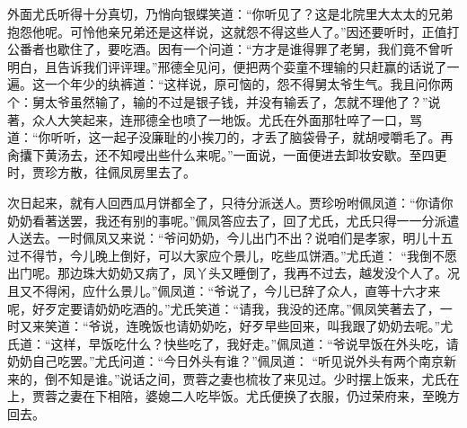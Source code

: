 \begin{parag}
    外面尤氏听得十分真切，乃悄向银蝶笑道：“你听见了？这是北院里大太太的兄弟抱怨他呢。可怜他亲兄弟还是这样说，这就怨不得这些人了。”因还要听时，正值打公番者也歇住了，要吃酒。因有一个问道：“方才是谁得罪了老舅，我们竟不曾听明白，且告诉我们评评理。”邢德全见问，便把两个娈童不理输的只赶赢的话说了一遍。这一个年少的纨裤道：“这样说，原可恼的，怨不得舅太爷生气。我且问你两个：舅太爷虽然输了，输的不过是银子钱，并没有输丢了，怎就不理他了？”说著，众人大笑起来，连邢德全也喷了一地饭。尤氏在外面那牡啐了一口，骂道：“你听听，这一起子没廉耻的小挨刀的，才丢了脑袋骨子，就胡唚嚼毛了。再肏攮下黄汤去，还不知唚出些什么来呢。”一面说，一面便进去卸妆安歇。至四更时，贾珍方散，往佩凤房里去了。
\end{parag}


\begin{parag}
    次日起来，就有人回西瓜月饼都全了，只待分派送人。贾珍吩咐佩凤道：“你请你奶奶看著送罢，我还有别的事呢。”佩凤答应去了，回了尤氏，尤氏只得一一分派遣人送去。一时佩凤又来说：“爷问奶奶，今儿出门不出？说咱们是孝家，明儿十五过不得节，今儿晚上倒好，可以大家应个景儿，吃些瓜饼酒。”尤氏道： “我倒不愿出门呢。那边珠大奶奶又病了，凤丫头又睡倒了，我再不过去，越发没个人了。况且又不得闲，应什么景儿。”佩凤道：“爷说了，今儿已辞了众人，直等十六才来呢，好歹定要请奶奶吃酒的。”尤氏笑道：“请我，我没的还席。”佩凤笑著去了，一时又来笑道：“爷说，连晚饭也请奶奶吃，好歹早些回来，叫我跟了奶奶去呢。”尤氏道：“这样，早饭吃什么？快些吃了，我好走。”佩凤道：“爷说早饭在外头吃，请奶奶自己吃罢。”尤氏问道：“今日外头有谁？”佩凤道： “听见说外头有两个南京新来的，倒不知是谁。”说话之间，贾蓉之妻也梳妆了来见过。少时摆上饭来，尤氏在上，贾蓉之妻在下相陪，婆媳二人吃毕饭。尤氏便换了衣服，仍过荣府来，至晚方回去。
\end{parag}


